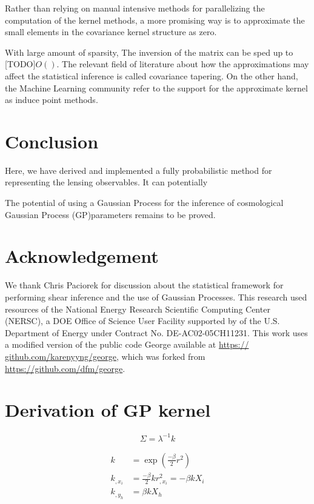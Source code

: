 Rather than relying on manual intensive methods for parallelizing the
computation of the kernel methods, a more promising way is to approximate the
small elements in the covariance kernel structure as zero. 


With large amount of
sparsity, The inversion of the matrix can be sped up to [TODO]$O()$.
The relevant field of literature about how the approximations may affect the
statistical inference is called covariance tapering. On the other hand,  
the Machine Learning community refer to the support for the approximate kernel
as induce point methods.


\section{Conclusion}
Here, we have derived and implemented a fully probabilistic method for 
representing the lensing observables. It can potentially  

The potential of using a Gaussian Process for the inference of cosmological 
Gaussian Process (GP)parameters remains to be proved. 

\section{Acknowledgement}
We thank Chris Paciorek for discussion about the statistical
framework for performing shear inference and the
use of Gaussian Processes.
This research
used resources of the National Energy Research Scientific 
Computing Center (NERSC), a DOE Office of Science
User Facility supported by 
of the U.S. Department of Energy under Contract No.
DE-AC02-05CH11231.
 This work uses a modified version
of the public code {\sc George} available at \href{https://
github.com/karenyyng/george}{https://
github.com/karenyyng/george}, which was forked from
\href{https://github.com/dfm/george}{https://github.com/dfm/george}.



\appendix 
\section{Derivation of GP kernel}

\begin{equation*}
\Sigma = \lambda^{-1} k 
\end{equation*}

\begin{align}
k &= \exp{\left(\frac{-\beta}{2} r^2 \right)}\\
k_{,x_i} &= \frac{-\beta}{2} k r^2_{,x_i} = -\beta k X_i\\ 
k_{,y_h} &= \beta k X_h 
\end{align}


